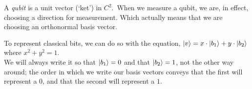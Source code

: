 
\begin{definition}
    A \emph{qubit} is a unit vector (`ket') in $C^2$.\
    When we measure a qubit, we are, in effect, choosing a direction for measurement. Which actually means that we are choosing an orthonormal basis vector.
\end{definition}

\begin{note}
    To represent classical bits, we can do so with the equation, $\lvert v\rangle = x \cdot \lvert b_1\rangle + y \cdot \lvert b_2\rangle$ where $x^2 + y^2 = 1$.\\
    We will always write it so that $\lvert b_1\rangle = 0$ and that $\lvert b_2\rangle = 1$, not the other way around; the order in which we write our basis vectors conveys that the first will represent a $0$, and that the second will represent a $1$.
\end{note}

